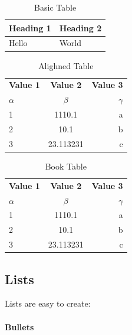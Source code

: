\documentclass{report}[a4paper,12pt] %
\begin{document}
\begin{table}[!h]
  \centering
  \caption{Basic Table}
  \begin{tabular}{|l|l|}
  \hline
      \textbf{Heading 1} & \textbf{Heading 2} \\ \hline
      Hello & World \\ \hline
  \end{tabular}
  \label{tab:basic}
\end{table}

\begin{table}[h!]
  \begin{center}
    \caption{Alighned Table}
    \label{tab:alighned}
    \begin{tabular}{l|c|r} %
      \textbf{Value 1} & \textbf{Value 2} & \textbf{Value 3}\\
      $\alpha$ & $\beta$ & $\gamma$ \\
      \hline
      1 & 1110.1 & a\\
      2 & 10.1 & b\\
      3 & 23.113231 & c\\
    \end{tabular}
  \end{center}
\end{table}

\begin{table}[h!]
  \centering
  \caption{Book Table}
  \label{tab:book}
  \begin{tabular}{@{}lcr@{}} %
    \toprule %
    \textbf{Value 1} & \textbf{Value 2} & \textbf{Value 3}\\
    $\alpha$ & $\beta$ & $\gamma$ \\
    \midrule %
    1 & 1110.1 & a\\
    2 & 10.1 & b\\
    3 & 23.113231 & c\\
    \bottomrule %
  \end{tabular}
\end{table}

\subsection{Lists}
Lists are easy to create:
\paragraph{Bullets}
\end{document}

